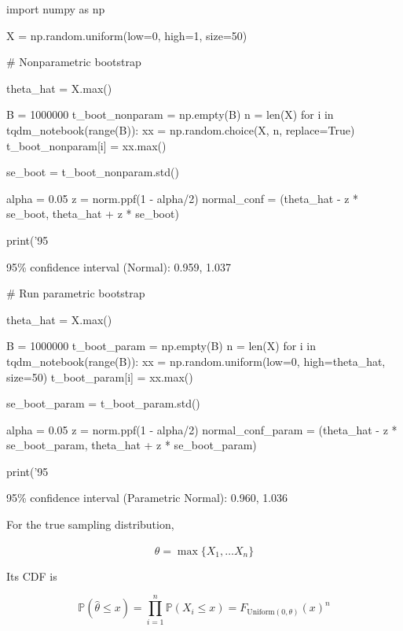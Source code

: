 \begin{python}
import numpy as np

X = np.random.uniform(low=0, high=1, size=50)
\end{python}

\begin{python}
# Nonparametric bootstrap

theta_hat = X.max()

B = 1000000
t_boot_nonparam = np.empty(B)
n = len(X)
for i in tqdm_notebook(range(B)):
    xx = np.random.choice(X, n, replace=True)
    t_boot_nonparam[i] = xx.max()
    
se_boot = t_boot_nonparam.std()

alpha = 0.05
z = norm.ppf(1 - alpha/2)
normal_conf = (theta_hat - z * se_boot, theta_hat + z * se_boot)

print('95%
\end{python}

\begin{console}
95\% confidence interval (Normal):        0.959, 1.037
\end{console}

\begin{python}
# Run parametric bootstrap

theta_hat = X.max()

B = 1000000
t_boot_param = np.empty(B)
n = len(X)
for i in tqdm_notebook(range(B)):
    xx = np.random.uniform(low=0, high=theta_hat, size=50)
    t_boot_param[i] = xx.max()
    
se_boot_param = t_boot_param.std()

alpha = 0.05
z = norm.ppf(1 - alpha/2)
normal_conf_param = (theta_hat - z * se_boot_param, theta_hat + z * se_boot_param)

print('95%
\end{python}

\begin{console}
95\% confidence interval (Parametric Normal):     0.960, 1.036
\end{console}

For the true sampling distribution,

\[\hat{\theta} = \max \{ X_1, \dots X_n \}\]

Its CDF is

\[\mathbb{P}(\hat{\theta} \leq x) = \prod_{i=1}^n \mathbb{P}(X_i \leq x) = F_{\text{Uniform}(0, \theta)}(x)^n\]

